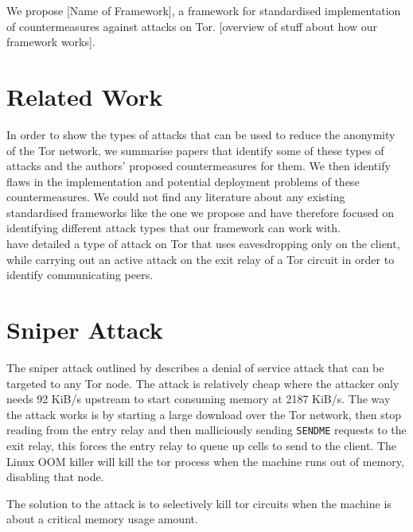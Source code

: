 \documentclass[9pt,technote]{IEEEtran}
\begin{document}
We propose [Name of Framework], a framework for standardised implementation of countermeasures against attacks on Tor. [overview of stuff about how our framework works].

\cite{hayesguard}\cite{gilad2012spying}\cite{sun2015raptor}\cite{biryukov2012torscan}\cite{jansen2014sniper}\cite{tor}

\section{Related Work} In order to show the types of attacks that can be used to
reduce the anonymity of the Tor network, we summarise papers that identify some
of these types of attacks and the authors' proposed countermeasures for them. We
then identify flaws in the implementation and potential deployment problems of
these countermeasures. We could not find any literature about any existing
standardised frameworks like the one we propose and have therefore focused on
identifying different attack types that our framework can work with.\\

\citeauthor{gilad2012spying} have detailed a type of attack on Tor that uses
eavesdropping only on the client, while carrying out an active attack on the
exit relay of a Tor circuit in order to identify communicating peers.

\section{Sniper Attack}
The sniper attack outlined by \citeauthor{jansen2014sniper} describes a denial
of service attack that can be targeted to any Tor node. The attack is relatively
cheap where the attacker only needs 92 KiB/s upstream to start consuming memory
at 2187 KiB/s. The way the attack works is by starting a large download over the
Tor network, then stop reading from the entry relay and then malliciously
sending \texttt{SENDME} requests to the exit relay, this forces the entry relay
to queue up cells to send to the client. The Linux OOM killer will kill the tor
process when the machine runs out of memory, disabling that node.

The solution to the attack is to selectively kill tor circuits when the machine
is about a critical memory usage amount.




\end{document}
